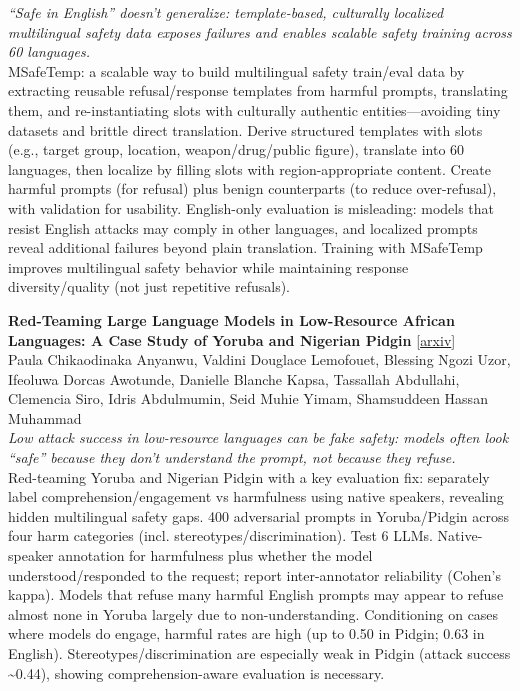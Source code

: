\documentclass[12pt,letterpaper]{article}
\begin{document}
{\small\textit{``Safe in English'' doesn't generalize: template-based, culturally localized multilingual safety data exposes failures and enables scalable safety training across 60 languages.}}\\[1pt]
{\footnotesize MSafeTemp: a scalable way to build multilingual safety train/eval data by extracting reusable refusal/response templates from harmful prompts, translating them, and re-instantiating slots with culturally authentic entities---avoiding tiny datasets and brittle direct translation. Derive structured templates with slots (e.g., target group, location, weapon/drug/public figure), translate into 60 languages, then localize by filling slots with region-appropriate content. Create harmful prompts (for refusal) plus benign counterparts (to reduce over-refusal), with validation for usability. English-only evaluation is misleading: models that resist English attacks may comply in other languages, and localized prompts reveal additional failures beyond plain translation. Training with MSafeTemp improves multilingual safety behavior while maintaining response diversity/quality (not just repetitive refusals).}

\medskip

{\small\textbf{Red-Teaming Large Language Models in Low-Resource African Languages: A Case Study of Yoruba and Nigerian Pidgin}} {\scriptsize[\href{https://arxiv.org/abs/2610.39590}{arxiv}]}\\
{\scriptsize Paula Chikaodinaka Anyanwu, Valdini Douglace Lemofouet, Blessing Ngozi Uzor, Ifeoluwa Dorcas Awotunde, Danielle Blanche Kapsa, Tassallah Abdullahi, Clemencia Siro, Idris Abdulmumin, Seid Muhie Yimam, Shamsuddeen Hassan Muhammad}\\

{\small\textit{Low attack success in low-resource languages can be fake safety: models often look ``safe'' because they don't understand the prompt, not because they refuse.}}\\[1pt]
{\footnotesize Red-teaming Yoruba and Nigerian Pidgin with a key evaluation fix: separately label comprehension/engagement vs harmfulness using native speakers, revealing hidden multilingual safety gaps. 400 adversarial prompts in Yoruba/Pidgin across four harm categories (incl. stereotypes/discrimination). Test 6 LLMs. Native-speaker annotation for harmfulness plus whether the model understood/responded to the request; report inter-annotator reliability (Cohen's kappa). Models that refuse many harmful English prompts may appear to refuse almost none in Yoruba largely due to non-understanding. Conditioning on cases where models do engage, harmful rates are high (up to 0.50 in Pidgin; 0.63 in English). Stereotypes/discrimination are especially weak in Pidgin (attack success \textasciitilde{}0.44), showing comprehension-aware evaluation is necessary.}
\end{document}

